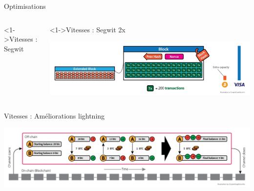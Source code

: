 \documentclass[presentation]{beamer}
\begin{document}
\begin{frame}[label={sec:org6f3e276}]{Optimisations}
\begin{columns}
\begin{column}{0.46\columnwidth}
\begin{block}<1->{Vitesses : Segwit}
\end{block}
\end{column}
\begin{column}{0.46\columnwidth}
\begin{block}<1->{Vitesses : Segwit 2x}
\begin{center}
\includegraphics[width=\textwidth]{Images/segWit2x.png}
\end{center}
\end{block}
\end{column}
\end{columns}

\begin{block}{Vitesses : Améliorations lightning}
\begin{center}
\includegraphics[width=\textwidth]{Images/payment-channels.png}
\end{center}
\end{block}
\end{frame}
\end{document}
